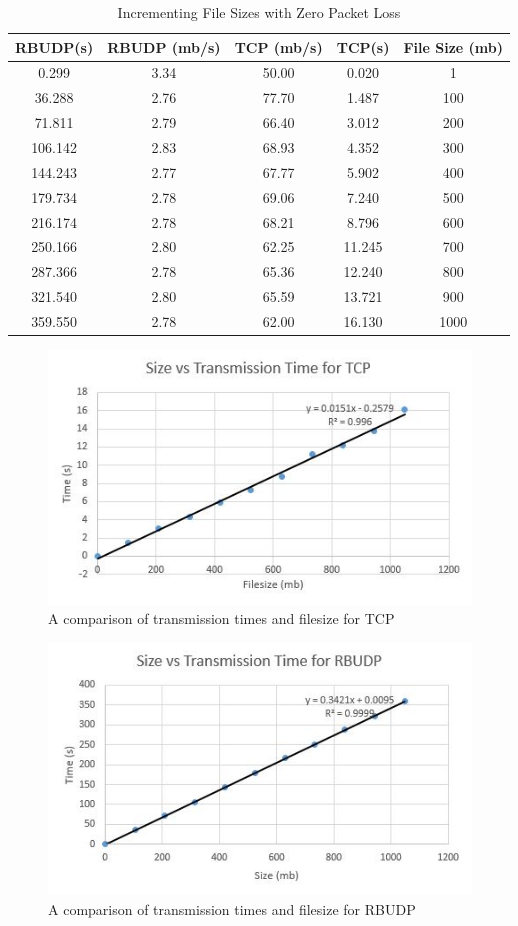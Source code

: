 \documentclass[13pt]{article}
\begin{document}
\begin{table}[h!]
\caption{Incrementing File Sizes with Zero Packet Loss}
\begin{center}
\begin{tabular}{|c|c|c|c|c|}
\hline RBUDP(s) & RBUDP (mb/s) & TCP (mb/s) & TCP(s) & File Size (mb) \\
\hline 0.299  &3.34&50.00&0.020&1 \\
\hline 36.288 &2.76&77.70&1.487&100 \\
\hline 71.811 &2.79&66.40&3.012&200 \\
\hline 106.142&2.83&68.93&4.352&300 \\
\hline 144.243&2.77&67.77&5.902&400 \\
\hline 179.734&2.78&69.06&7.240&500 \\
\hline 216.174&2.78&68.21&8.796&600 \\
\hline 250.166&2.80&62.25&11.245&700 \\
\hline 287.366&2.78&65.36&12.240&800 \\
\hline 321.540&2.80&65.59&13.721&900 \\
\hline 359.550&2.78&62.00&16.130&1000 \\
\hline
\end{tabular}
\end{center}
\end{table}

\begin{figure}[h!]
  \includegraphics{1m-1gTCP.JPG}
  \caption{A comparison of transmission times and filesize for TCP}
\end{figure}

\begin{figure}[h!]
  \includegraphics{1m-1gRBUDP.JPG}
  \caption{A comparison of transmission times and filesize for RBUDP}
\end{figure}
\end{document}
